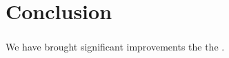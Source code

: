 \chapter{Conclusion}
\label{cha:conclusion}

\subsection{\launcher}
We have brought significant improvements the the \launcher. 

\subsection{\ct}

\subsection{\gc}